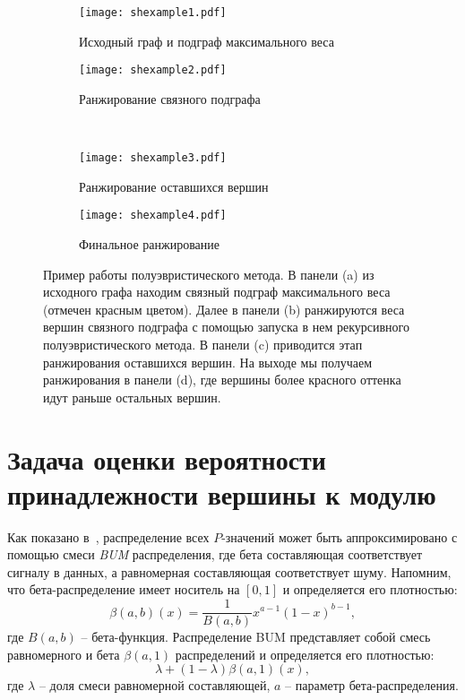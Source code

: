 \begin{figure}
    \begin{subfigure}{.5\textwidth}
        \centering
        \texttt{[image: shexample1.pdf]}
        \caption{\footnotesize{Исходный граф и подграф максимального веса}} 
    \end{subfigure}%
    \begin{subfigure}{.5\textwidth}
        \centering
        \texttt{[image: shexample2.pdf]}
        \caption{\footnotesize{Ранжирование связного подграфа}}
    \end{subfigure}\\%
    \begin{subfigure}{.5\textwidth}\centering
        \texttt{[image: shexample3.pdf]}
        \caption{\footnotesize{Ранжирование оставшихся вершин}}
    \end{subfigure}%
    \begin{subfigure}{.5\textwidth}
        \centering
        \texttt{[image: shexample4.pdf]}
        \caption{\footnotesize{Финальное ранжирование}}
    \end{subfigure}
    \centering
    \caption{
        Пример работы полуэвристического метода.  В панели (a) из исходного
        графа находим связный подграф максимального веса (отмечен красным
        цветом).  Далее в панели (b) ранжируются веса вершин связного подграфа
        с помощью запуска в нем рекурсивного полуэвристического метода.
        В панели (c) приводится этап ранжирования оставшихся вершин.  На выходе
        мы получаем ранжирования в панели (d), где вершины более красного
        оттенка идут раньше остальных вершин.
    }%
    \label{fig:shexample}%
\end{figure}





\section{Задача оценки вероятности принадлежности вершины к модулю}
Как показано в~\cite{Pounds2003,Dittrich2008a}, распределение всех $P$-значений
может быть аппроксимировано с помощью смеси \emph{BUM} распределения, где бета
составляющая соответствует сигналу в данных, а равномерная составляющая
соответствует шуму.  Напомним, что бета-распределение имеет носитель на $[0,
1]$ и определяется его плотностью:
\[\beta(a,b)(x) = \frac{1}{B(a,b)} x^{a-1}(1-x)^{b-1},\]
где $B(a, b)$ -- бета-функция. Распределение BUM представляет собой смесь
равномерного и бета $\beta(a, 1)$ распределений и определяется его плотностью:
\[\lambda +(1-\lambda)\beta(a,1)(x),\]
где $\lambda$ -- доля смеси равномерной составляющей, $a$ -- параметр
бета-распределения.

